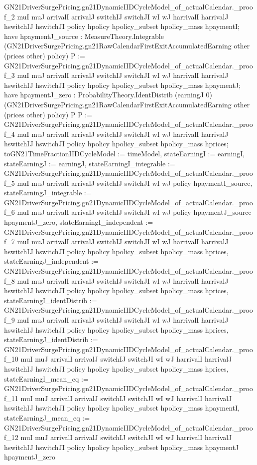 \documentclass[10pt]{article}
\begin{document}
\begin{ReviewVerbatim}
    GN21DriverSurgePricing.gn21DynamicIIDCycleModel_of_actualCalendar._proof_2 muI muJ arrivalI arrivalJ switchIJ
      switchJI wI wJ harrivalI harrivalJ hswitchIJ hswitchJI policy hpolicy hpolicy_subset hpolicy_mass hpaymentI;
  have hpaymentJ_source :
    MeasureTheory.Integrable
      (GN21DriverSurgePricing.gn21RawCalendarFirstExitAccumulatedEarning other (prices other) policy) P :=
    GN21DriverSurgePricing.gn21DynamicIIDCycleModel_of_actualCalendar._proof_3 muI muJ arrivalI arrivalJ switchIJ
      switchJI wI wJ harrivalI harrivalJ hswitchIJ hswitchJI policy hpolicy hpolicy_subset hpolicy_mass hpaymentJ;
  have hpaymentJ_zero :
    ProbabilityTheory.IdentDistrib (earningJ 0)
      (GN21DriverSurgePricing.gn21RawCalendarFirstExitAccumulatedEarning other (prices other) policy) P P :=
    GN21DriverSurgePricing.gn21DynamicIIDCycleModel_of_actualCalendar._proof_4 muI muJ arrivalI arrivalJ switchIJ
      switchJI wI wJ harrivalI harrivalJ hswitchIJ hswitchJI policy hpolicy hpolicy_subset hpolicy_mass hprices;
  { toGN21TimeFractionIIDCycleModel := timeModel, stateEarningI := earningI, stateEarningJ := earningJ,
    stateEarningI_integrable :=
      GN21DriverSurgePricing.gn21DynamicIIDCycleModel_of_actualCalendar._proof_5 muI muJ arrivalI arrivalJ switchIJ
        switchJI wI wJ policy hpaymentI_source,
    stateEarningJ_integrable :=
      GN21DriverSurgePricing.gn21DynamicIIDCycleModel_of_actualCalendar._proof_6 muI muJ arrivalI arrivalJ switchIJ
        switchJI wI wJ policy hpaymentJ_source hpaymentJ_zero,
    stateEarningI_independent :=
      GN21DriverSurgePricing.gn21DynamicIIDCycleModel_of_actualCalendar._proof_7 muI muJ arrivalI arrivalJ switchIJ
        switchJI wI wJ harrivalI harrivalJ hswitchIJ hswitchJI policy hpolicy hpolicy_subset hpolicy_mass hprices,
    stateEarningJ_independent :=
      GN21DriverSurgePricing.gn21DynamicIIDCycleModel_of_actualCalendar._proof_8 muI muJ arrivalI arrivalJ switchIJ
        switchJI wI wJ harrivalI harrivalJ hswitchIJ hswitchJI policy hpolicy hpolicy_subset hpolicy_mass hprices,
    stateEarningI_identDistrib :=
      GN21DriverSurgePricing.gn21DynamicIIDCycleModel_of_actualCalendar._proof_9 muI muJ arrivalI arrivalJ switchIJ
        switchJI wI wJ harrivalI harrivalJ hswitchIJ hswitchJI policy hpolicy hpolicy_subset hpolicy_mass hprices,
    stateEarningJ_identDistrib :=
      GN21DriverSurgePricing.gn21DynamicIIDCycleModel_of_actualCalendar._proof_10 muI muJ arrivalI arrivalJ switchIJ
        switchJI wI wJ harrivalI harrivalJ hswitchIJ hswitchJI policy hpolicy hpolicy_subset hpolicy_mass hprices,
    stateEarningI_mean_eq :=
      GN21DriverSurgePricing.gn21DynamicIIDCycleModel_of_actualCalendar._proof_11 muI muJ arrivalI arrivalJ switchIJ
        switchJI wI wJ harrivalI harrivalJ hswitchIJ hswitchJI policy hpolicy hpolicy_subset hpolicy_mass hpaymentI,
    stateEarningJ_mean_eq :=
      GN21DriverSurgePricing.gn21DynamicIIDCycleModel_of_actualCalendar._proof_12 muI muJ arrivalI arrivalJ switchIJ
        switchJI wI wJ harrivalI harrivalJ hswitchIJ hswitchJI policy hpolicy hpolicy_subset hpolicy_mass hpaymentJ
        hpaymentJ_zero }
\end{ReviewVerbatim}
\end{document}
